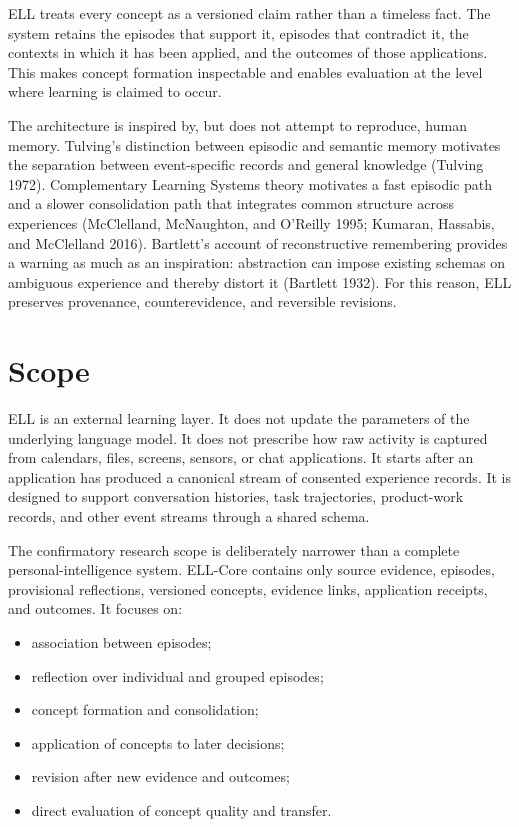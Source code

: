 \documentclass[
  english,
  a4paper,
  DIV=11,
  numbers=noendperiod]{scrreprt}
\providecommand{\tightlist}{%
  \setlength{\itemsep}{0pt}\setlength{\parskip}{0pt}}
\begin{document}
ELL treats every concept as a versioned claim rather than a timeless
fact. The system retains the episodes that support it, episodes that
contradict it, the contexts in which it has been applied, and the
outcomes of those applications. This makes concept formation inspectable
and enables evaluation at the level where learning is claimed to occur.

The architecture is inspired by, but does not attempt to reproduce,
human memory. Tulving's distinction between episodic and semantic memory
motivates the separation between event-specific records and general
knowledge (Tulving 1972). Complementary Learning Systems theory
motivates a fast episodic path and a slower consolidation path that
integrates common structure across experiences (McClelland, McNaughton,
and O'Reilly 1995; Kumaran, Hassabis, and McClelland 2016). Bartlett's
account of reconstructive remembering provides a warning as much as an
inspiration: abstraction can impose existing schemas on ambiguous
experience and thereby distort it (Bartlett 1932). For this reason, ELL
preserves provenance, counterevidence, and reversible revisions.

\section{Scope}\label{scope}

ELL is an external learning layer. It does not update the parameters of
the underlying language model. It does not prescribe how raw activity is
captured from calendars, files, screens, sensors, or chat applications.
It starts after an application has produced a canonical stream of
consented experience records. It is designed to support conversation
histories, task trajectories, product-work records, and other event
streams through a shared schema.

The confirmatory research scope is deliberately narrower than a complete
personal-intelligence system. ELL-Core contains only source evidence,
episodes, provisional reflections, versioned concepts, evidence links,
application receipts, and outcomes. It focuses on:

\begin{itemize}
\tightlist
\item
  association between episodes;
\item
  reflection over individual and grouped episodes;
\item
  concept formation and consolidation;
\item
  application of concepts to later decisions;
\item
  revision after new evidence and outcomes;
\item
  direct evaluation of concept quality and transfer.
\end{itemize}
\end{document}
